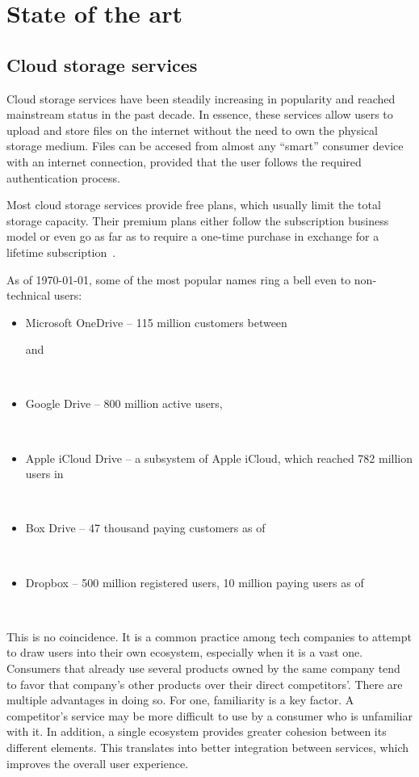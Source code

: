 \chapter{State of the art}

\section{Cloud storage services} \label{cloud_storage_services}

Cloud storage services have been steadily increasing in popularity and reached mainstream status in the past decade. In essence, these services allow users to upload and store files on the internet without the need to own the physical storage medium. Files can be accesed from almost any ``smart'' consumer device with an internet connection, provided that the user follows the required authentication process.

Most cloud storage services provide free plans, which usually limit the total storage capacity. Their premium plans either follow the subscription business model or even go as far as to require a one-time purchase in exchange for a lifetime subscription~\cite{get_3tb_of_lifetime_cloud_storage}.

As of \monthyeardate\today, some of the most popular names ring a bell even to non-technical users:
\begin{itemize} \label{lst:cloud_storage_services}
\itemsep0em
\item Microsoft OneDrive -- 115 million customers between \date{2007} and \date{2017}~\cite{10_years_of_onedrive}
\item Google Drive -- 800 million active users, \date{March 2017}~\cite{google_plans_to_leverage,google_updates_drive_focus_on_business}
\item Apple iCloud Drive -- a subsystem of Apple iCloud, which reached 782 million users in \date{February 2016}~\cite{icloud_hits_782m_users}
\item Box Drive -- 47 thousand paying customers as of \date{August 2015}~\cite{box_hires_nasdaq_exec}
\item Dropbox -- 500 million registered users, 10 million paying users as of \date{December 2017}~\cite{dropbox_inc_registration_statement}
\end{itemize}

This is no coincidence. It is a common practice among tech companies to attempt to draw users into their own ecosystem, especially when it is a vast one. Consumers that already use several products owned by the same company tend to favor that company's other products over their direct competitors'. There are multiple advantages in doing so. For one, familiarity is a key factor. A competitor's service may be more difficult to use by a consumer who is unfamiliar with it. In addition, a single ecosystem provides greater cohesion between its different elements. This translates into better integration between services, which improves the overall user experience.

